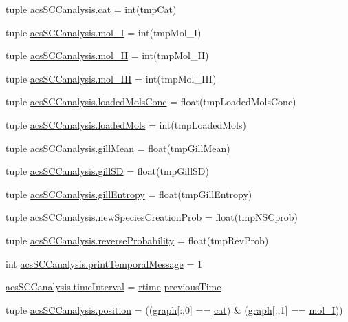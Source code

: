 \begin{DoxyCompactItemize}
\item 
tuple \hyperlink{a00102_aea872e34fe0da6302f6195f1b2315148}{acs\-S\-C\-Canalysis.\-cat} = int(tmp\-Cat)
\item 
tuple \hyperlink{a00102_ae13d6607ffa236891a9af05bfa88cfcc}{acs\-S\-C\-Canalysis.\-mol\-\_\-\-I} = int(tmp\-Mol\-\_\-\-I)
\item 
tuple \hyperlink{a00102_a8f2878f5909e4aeb9155a1103eaba413}{acs\-S\-C\-Canalysis.\-mol\-\_\-\-I\-I} = int(tmp\-Mol\-\_\-\-I\-I)
\item 
tuple \hyperlink{a00102_a20047e8516f386a7e98ffa0efec09471}{acs\-S\-C\-Canalysis.\-mol\-\_\-\-I\-I\-I} = int(tmp\-Mol\-\_\-\-I\-I\-I)
\item 
tuple \hyperlink{a00102_abe83f5e0ae3bd65da15a697a979aeea1}{acs\-S\-C\-Canalysis.\-loaded\-Mols\-Conc} = float(tmp\-Loaded\-Mols\-Conc)
\item 
tuple \hyperlink{a00102_ab4566d46d368eb4f93ff6db5191648bd}{acs\-S\-C\-Canalysis.\-loaded\-Mols} = int(tmp\-Loaded\-Mols)
\item 
tuple \hyperlink{a00102_a4e862896701636d17752f14810ff687f}{acs\-S\-C\-Canalysis.\-gill\-Mean} = float(tmp\-Gill\-Mean)
\item 
tuple \hyperlink{a00102_acdb3e72aea08c29494799fd08763b406}{acs\-S\-C\-Canalysis.\-gill\-S\-D} = float(tmp\-Gill\-S\-D)
\item 
tuple \hyperlink{a00102_a4c214eb4f6812d6182bae32715bce3ad}{acs\-S\-C\-Canalysis.\-gill\-Entropy} = float(tmp\-Gill\-Entropy)
\item 
tuple \hyperlink{a00102_a47b24df6e487f6dd90158dde93cc7c93}{acs\-S\-C\-Canalysis.\-new\-Species\-Creation\-Prob} = float(tmp\-N\-S\-Cprob)
\item 
tuple \hyperlink{a00102_aa7db2dba66810044f9c5238eccc995b7}{acs\-S\-C\-Canalysis.\-reverse\-Probability} = float(tmp\-Rev\-Prob)
\item 
int \hyperlink{a00102_a3de1ee32e24403b152d565d8c52cf7fd}{acs\-S\-C\-Canalysis.\-print\-Temporal\-Message} = 1
\item 
\hyperlink{a00102_a7d0f86310c439e970e0b41121364027c}{acs\-S\-C\-Canalysis.\-time\-Interval} = \hyperlink{a00028_afc6b38657a313b9f1de2ee356910b6ee}{rtime}-\/\hyperlink{a00028_a17b8652a085b5add031a40fb1c9a680e}{previous\-Time}
\item 
tuple \hyperlink{a00102_ac09e85f8df5b7c8c7d2caf87e9193421}{acs\-S\-C\-Canalysis.\-position} = ((\hyperlink{a00028_a2745e24fec2a44d51f4452beb1596bd3}{graph}\mbox{[}\-:,0\mbox{]} == \hyperlink{a00028_a7073f71a43389f3032e69b1fffc2551a}{cat}) \& (\hyperlink{a00028_a2745e24fec2a44d51f4452beb1596bd3}{graph}\mbox{[}\-:,1\mbox{]} == \hyperlink{a00028_ab346189eef5359a07ba32144ddcd4465}{mol\-\_\-\-I}))

\end{DoxyCompactItemize}

